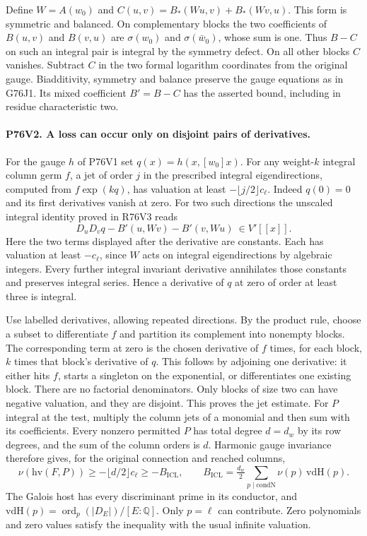 Define $W=A(w_0)$ and
$C(u,v)= B_*(Wu,v)+B_*(Wv,u)$. This form is symmetric and
balanced. On complementary blocks the two coefficients of
$B(u,v)$ and $B(v,u)$ are $\sigma(w_0)$ and
$\sigma(\bar w_0)$, whose sum is one. Thus $B-C$ on such an
integral pair is integral by the symmetry defect. On all other
blocks $C$ vanishes. Subtract $C$ in the two formal logarithm
coordinates from the original gauge. Biadditivity, symmetry and
balance preserve the gauge equations as in G76J1. Its mixed
coefficient $B'=B-C$ has the asserted bound, including in
residue characteristic two.

\paragraph{P76V2. A loss can occur only on disjoint pairs of derivatives.}
For the gauge $h$ of P76V1 set $q(x)=h(x,[w_0]x)$. For any
weight-$k$ integral column germ $f$, a jet of order $j$ in
the prescribed integral eigendirections, computed from
$f\exp(kq)$, has valuation at least $-\lfloor j/2\rfloor c_\ell$.
Indeed $q(0)=0$ and its first derivatives vanish at zero. For
two such directions the unscaled integral identity proved in
R76V3 reads
\[
 D_uD_vq - B'(u,Wv)-B'(v,Wu)\ \in V'[[x]].
\]
Here the two terms displayed after the derivative are constants.
Each has valuation at least $-c_\ell$, since $W$ acts on integral
eigendirections by algebraic integers. Every further integral
invariant derivative annihilates those constants and preserves
integral series. Hence a derivative of $q$ at zero of order at
least three is integral.

Use labelled derivatives, allowing repeated directions. By the
product rule, choose a subset to differentiate $f$ and partition
its complement into nonempty blocks. The corresponding term at
zero is the chosen derivative of $f$ times, for each block, $k$
times that block's derivative of $q$. This follows by adjoining
one derivative: it either hits $f$, starts a singleton on the
exponential, or differentiates one existing block. There are no
factorial denominators. Only blocks of size two can have negative
valuation, and they are disjoint. This proves the jet estimate.
For $P$ integral at the test, multiply the column jets of a
monomial and then sum with its coefficients. Every nonzero
permitted $P$ has total degree $d=d_w$ by its row degrees, and
the sum of the column orders is $d$. Harmonic gauge invariance
therefore gives, for the original connection and reached columns,
\[
 \nu(\mathrm{hv}(F,P))\ge-\lfloor d/2\rfloor c_\ell
                 \ge -B_{\mathrm{ICL}},
 \qquad B_{\mathrm{ICL}}=\tfrac{d_w}{2}
          \sum_{p\mid\mathrm{condN}}\nu(p)\,\mathrm{vdH}(p).
\]
The Galois host has every discriminant prime in its conductor,
and $\mathrm{vdH}(p)=\operatorname{ord}_p(|D_E|)/[E:\mathbb Q]$.
Only $p=\ell$ can contribute. Zero polynomials and zero values
satisfy the inequality with the usual infinite valuation.

